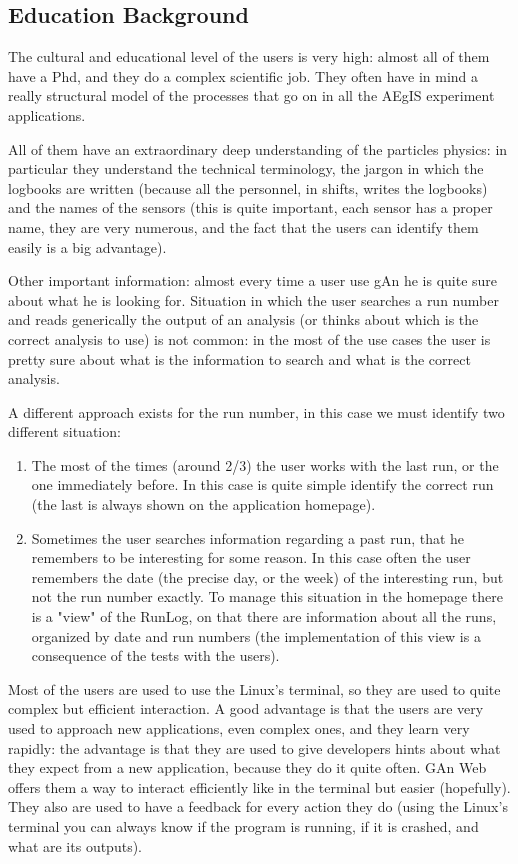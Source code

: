 \subsection{Education Background}
The cultural and educational level of the users is very high: almost all of them have a Phd, and they do a complex scientific job. They often have in mind a really structural model of the processes that go on in all the AEgIS experiment applications.

All of them have an extraordinary deep understanding of the particles physics: in particular they understand the technical terminology, the jargon in which the logbooks are written (because all the personnel, in shifts, writes the logbooks) and the names of the sensors (this is quite important, each sensor has a proper name, they are very numerous, and the fact that the users can identify them easily is a big advantage). 

Other important information: almost every time a user use gAn he is quite sure about what he is looking for. Situation in which the user searches a run number and reads generically the output of an analysis (or thinks about which is the correct analysis to use) is not common: in the most of the use cases the user is pretty sure about what is the information to search and what is the correct analysis. 

A different approach exists for the run number, in this case we must identify two different situation:

\begin{enumerate}

\item The most of the times (around 2/3) the user works with the last run, or the one immediately before. In this case is quite simple identify the correct run (the last is always shown on the application homepage).
\item Sometimes the user searches information regarding a past run, that he remembers to be interesting for some reason. In this case often the user remembers the date (the precise day, or the week) of the interesting run, but not the run number exactly. To manage this situation in the homepage there is a "view" of the RunLog, on that there are information about all the runs, organized by date and run numbers (the implementation of this view is a consequence of the tests with the users). 

\end{enumerate}

Most of the users are used to use the Linux's terminal, so they are used to quite complex but efficient interaction. A good advantage is that the users are very used to approach new applications, even complex ones, and they learn very rapidly: the advantage is that they are used to give developers hints about what they expect from a new application, because they do it quite often. GAn Web offers them a way to interact efficiently like in the terminal but easier (hopefully). They also are used to have a feedback for every action they do (using the Linux's terminal you can always know if the program is running, if it is crashed, and what are its outputs).

